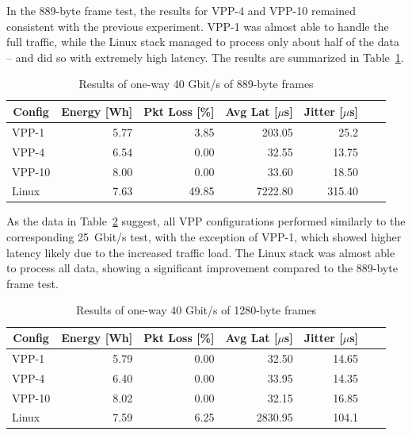 In the 889-byte frame test, the results for VPP-4 and VPP-10 remained consistent with the previous experiment.
VPP-1 was almost able to handle the full traffic, while the Linux stack managed to process only about half of the data -- and did so with extremely high latency.
The results are summarized in Table~\ref{tab:40udp:889B}.

\begin{table}[h!]
\centering
\caption{Results of one-way 40 Gbit/s of 889-byte frames}
\begin{tabular}{|l|r|r|r|r|r|r|}
\hline
\multicolumn{1}{|c|}{\textbf{Config}} &
\multicolumn{1}{c|}{\textbf{Energy [Wh] }} &
\multicolumn{1}{c|}{\textbf{Pkt Loss [\%]}} &
\multicolumn{1}{c|}{\textbf{Avg Lat [$\mu$s]}} &
\multicolumn{1}{c|}{\textbf{Jitter [$\mu$s]}} \\
\hline 
VPP-1 & 5.77 & 3.85 & 203.05 & 25.2 \\
VPP-4 & 6.54 & 0.00 & 32.55 & 13.75 \\
VPP-10 & 8.00 & 0.00 & 33.60 & 18.50 \\
Linux & 7.63 & 49.85 & 7222.80 & 315.40 \\
\hline
\end{tabular}
\label{tab:40udp:889B}
\end{table}

As the data in Table~\ref{tab:40udp:1280B} suggest, all VPP configurations performed similarly to the corresponding 25~Gbit/s test,
with the exception of VPP-1, which showed higher latency likely due to the increased traffic load.
The Linux stack was almost able to process all data, showing a significant improvement compared to the 889-byte frame test.

\begin{table}[h!]
\centering
\caption{Results of one-way 40 Gbit/s of 1280-byte frames}
\begin{tabular}{|l|r|r|r|r|r|r|}
\hline
\multicolumn{1}{|c|}{\textbf{Config}} &
\multicolumn{1}{c|}{\textbf{Energy [Wh] }} &
\multicolumn{1}{c|}{\textbf{Pkt Loss [\%]}} &
\multicolumn{1}{c|}{\textbf{Avg Lat [$\mu$s]}} &
\multicolumn{1}{c|}{\textbf{Jitter [$\mu$s]}} \\
\hline 
VPP-1 & 5.79 & 0.00 & 32.50 & 14.65 \\
VPP-4 & 6.40 & 0.00 & 33.95 & 14.35 \\
VPP-10 & 8.02 & 0.00 & 32.15 & 16.85 \\
Linux & 7.59 & 6.25 & 2830.95 & 104.1 \\
\hline
\end{tabular}
\label{tab:40udp:1280B}
\end{table}

